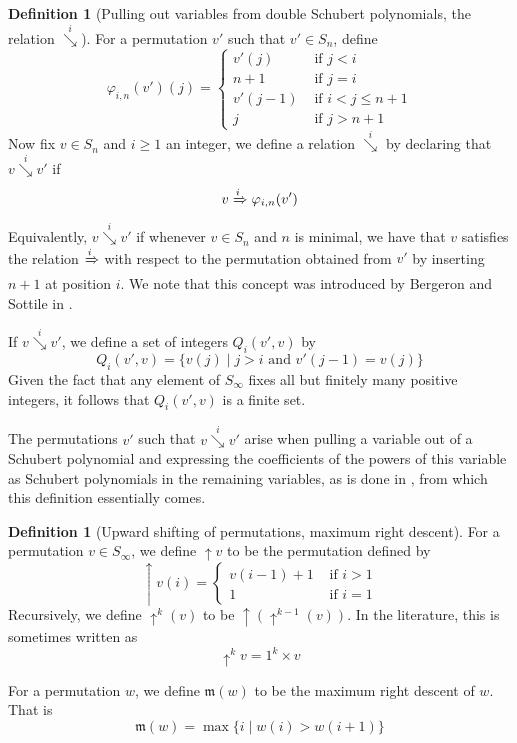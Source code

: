 \documentclass{amsart}
\theoremstyle{definition}
\newtheorem{definition}[lemma]{Definition}
\theoremstyle{remark}
\numberwithin{equation}{subsection}
\newcommand{\shup}{{\uparrow}}
\newcommand{\downvar}[1]{\stackrel{#1}{\searrow}}
\newcommand{\Tom}[1]{\xRightarrow{#1}}
\newcommand{\smpre}[2]{\ensuremath{}\prod_{b\in #2}(#1-b)}
\newcommand{\maxd}{\mathfrak{m}}
\begin{document}
\begin{definition}[Pulling out variables from double Schubert polynomials, the relation $\downvar{i}$] \label{definition:polysequence}
		For a permutation $v'$ such that $v'\in S_{n}$, define
		$$\varphi_{i,n}(v')(j)=\begin{cases}
			v'(j)&\mbox{ if }j<i\\
			n+1&\mbox{ if }j=i\\
			v'(j-1)&\mbox{ if }i<j\leq n+1\\
			j&\mbox{ if }j>n+1
		\end{cases}$$
		Now fix $v\in S_n$ and $i\geq 1$ an integer, we define a relation $\downvar{i}$ by declaring that $v\downvar{i} v'$ if 
		$$v\Tom{i}\varphi_{i,n}(v')$$
		Equivalently, $v\downvar{i} v'$ if whenever $v\in S_n$ and $n$ is minimal, we have that $v$ satisfies the relation $\Tom{i}$ with respect to the permutation obtained from $v'$ by inserting $n+1$ at position $i$. We note that this concept was introduced by Bergeron and Sottile in \cite{bsskew}.
		
		If $v\downvar{i} v'$, we define a set of integers $Q_i(v',v)$ by
		$$Q_i(v',v)=\{v(j)\mid j>i\mbox{ and }v'(j-1)=v(j)\}$$
		Given the fact that any element of $S_\infty$ fixes all but finitely many positive integers, it follows that $Q_i(v',v)$ is a finite set.
		
		The permutations $v'$ such that $v\downvar{i} v'$ arise when pulling a variable out of a Schubert polynomial and expressing the coefficients of the powers of this variable as Schubert polynomials in the remaining variables, as is done in \cite{coprod}, from which this definition essentially comes.

  \end{definition}
  
\begin{definition}[Upward shifting of permutations, maximum right descent]
		For a permutation $v\in S_\infty$, we define $\shup{v}$ to be the permutation defined by
		$$\shup{v}(i) = \begin{cases}
			v(i-1)+1&\mbox{ if }i>1\\
			1&\mbox{ if }i=1
		\end{cases}$$
		Recursively, we define $\shup^k(v)$ to be $\shup(\shup^{k-1}(v))$. In the literature, this is sometimes written as
    $$\shup^kv = 1^k\times v$$

		For a permutation $w$, we define $\maxd(w)$ to be the maximum right descent of $w$. That is
		$$\maxd(w) = \max\{i\mid w(i)>w(i+1)\}$$

	\end{definition}
\end{document}

